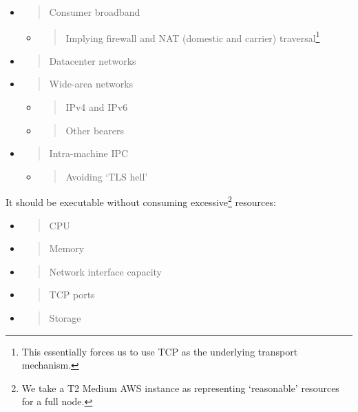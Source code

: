 \documentclass[]{article}
\begin{document}
\begin{itemize}
\item
  \begin{quote}
  Consumer broadband
  \end{quote}

  \begin{itemize}
  \item
    \begin{quote}
    Implying firewall and NAT (domestic and carrier) traversal\footnote{This
      essentially forces us to use TCP as the underlying transport
      mechanism.}
    \end{quote}
  \end{itemize}
\item
  \begin{quote}
  Datacenter networks
  \end{quote}
\item
  \begin{quote}
  Wide-area networks
  \end{quote}

  \begin{itemize}
  \item
    \begin{quote}
    IPv4 and IPv6
    \end{quote}
  \item
    \begin{quote}
    Other bearers
    \end{quote}
  \end{itemize}
\item
  \begin{quote}
  Intra-machine IPC
  \end{quote}

  \begin{itemize}
  \item
    \begin{quote}
    Avoiding `TLS hell'
    \end{quote}
  \end{itemize}
\end{itemize}

It should be executable without consuming excessive\footnote{We take a
  T2 Medium AWS instance as representing `reasonable' resources for a
  full node.} resources:

\begin{itemize}
\item
  \begin{quote}
  CPU
  \end{quote}
\item
  \begin{quote}
  Memory
  \end{quote}
\item
  \begin{quote}
  Network interface capacity
  \end{quote}
\item
  \begin{quote}
  TCP ports
  \end{quote}
\item
  \begin{quote}
  Storage
  \end{quote}
\end{itemize}
\end{document}
